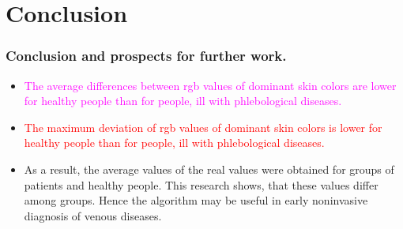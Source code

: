 \documentclass[10pt,pdf]{beamer}
\begin{document}
\section{Conclusion}
\begin{frame}
\frametitle{Conclusion and prospects for further work.}
\begin{itemize}
    \item[\textcolor{magenta}{\textbullet}] \textcolor{magenta}{The average differences between rgb values of dominant skin colors are lower for healthy people than for people, ill with phlebological diseases. 
}
    \item[\textcolor{red}{\textbullet}] \textcolor{red}{The maximum deviation of rgb values of dominant skin colors is lower for healthy people than for people, ill with phlebological diseases.}
    
    \item[\textcolor{col0}{\textbullet}] \textcolor{col0}{As a result, the average values of the real values were obtained for groups of patients and healthy people. This research shows, that these values differ among groups. Hence the algorithm may be useful in early noninvasive diagnosis of venous diseases.}

\end{itemize}
\end{frame}
\end{document}

